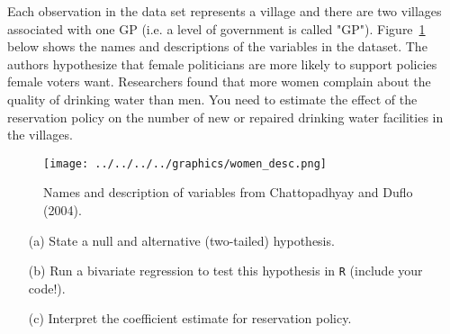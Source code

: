 \documentclass[12pt,letterpaper]{article}
\begin{document}
\noindent Each observation in the data set represents a village and there are two villages associated with one GP (i.e. a level of government is called "GP"). Figure~\ref{fig:women_desc} below shows the names and descriptions of the variables in the dataset. The authors hypothesize that female politicians are more likely to support policies female voters want. Researchers found that more women complain about the quality of drinking water than men. You need to estimate the effect of the reservation policy on the number of new or repaired drinking water facilities in the villages.
\vspace{.5cm}
\begin{figure}[h!]
	\caption{\footnotesize{Names and description of variables from Chattopadhyay and Duflo (2004).}}
	\vspace{.5cm}
	\centering
	\label{fig:women_desc}
	\texttt{[image: ../../../../graphics/women\_desc.png]}
\end{figure}		

\newpage
\begin{enumerate}
	\item [(a)] State a null and alternative (two-tailed) hypothesis. 
	
	\vspace{6cm}
	\item [(b)] Run a bivariate regression to test this hypothesis in \texttt{R} (include your code!).
	
	\vspace{6cm}
	\item [(c)] Interpret the coefficient estimate for reservation policy. 
\end{enumerate}
\end{document}
